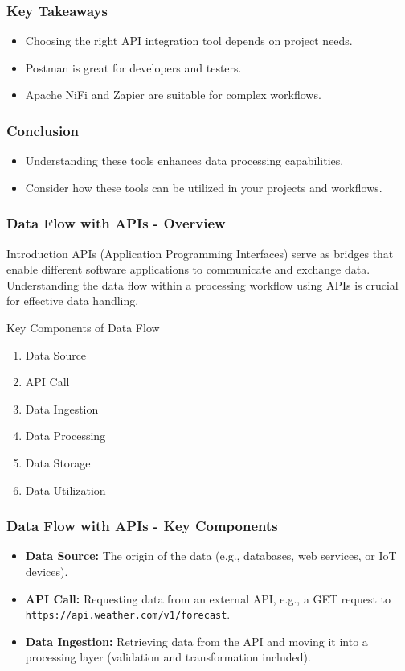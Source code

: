 \documentclass[aspectratio=169]{beamer}
\begin{document}
\begin{frame}[fragile]
    \frametitle{Key Takeaways}
    \begin{itemize}
        \item Choosing the right API integration tool depends on project needs.
        \item Postman is great for developers and testers.
        \item Apache NiFi and Zapier are suitable for complex workflows.
    \end{itemize}
\end{frame}

\begin{frame}[fragile]
    \frametitle{Conclusion}
    \begin{itemize}
        \item Understanding these tools enhances data processing capabilities.
        \item Consider how these tools can be utilized in your projects and workflows.
    \end{itemize}
\end{frame}

\begin{frame}[fragile]
  \frametitle{Data Flow with APIs - Overview}
  \begin{block}{Introduction}
  APIs (Application Programming Interfaces) serve as bridges that enable different software applications to communicate and exchange data. 
  Understanding the data flow within a processing workflow using APIs is crucial for effective data handling.
  \end{block}
  
  \begin{block}{Key Components of Data Flow}
  \begin{enumerate}
    \item Data Source
    \item API Call
    \item Data Ingestion
    \item Data Processing
    \item Data Storage
    \item Data Utilization
  \end{enumerate}
  \end{block}
  
\end{frame}

\begin{frame}[fragile]
  \frametitle{Data Flow with APIs - Key Components}
  \begin{itemize}
    \item \textbf{Data Source:} The origin of the data (e.g., databases, web services, or IoT devices).
    \item \textbf{API Call:} Requesting data from an external API, e.g., a GET request to \texttt{https://api.weather.com/v1/forecast}.
    \item \textbf{Data Ingestion:} Retrieving data from the API and moving it into a processing layer (validation and transformation included).
  \end{itemize}
\end{frame}
\end{document}

